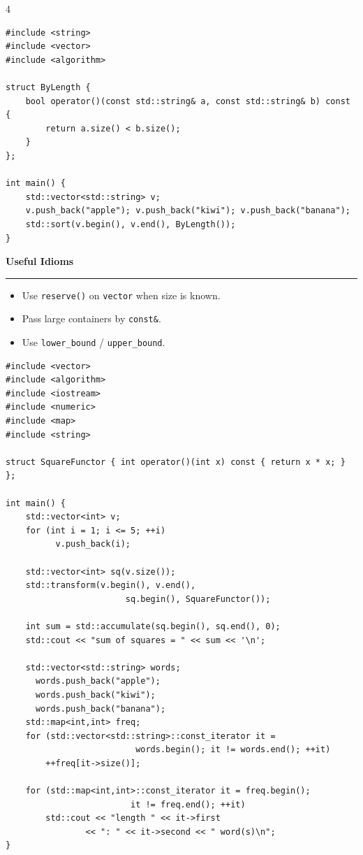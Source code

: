 \documentclass[final]{beamer}
\renewcommand{\section}[1]{%
  \par\vspace{1em}%
  {\noindent\Large\bfseries #1\par}%
  \vspace{0.5em}\hrule\vspace{1em}%
}
\begin{document}
\begin{frame}[t,fragile]
\begin{multicols}{4}
\begin{lstlisting}
#include <string>
#include <vector>
#include <algorithm>

struct ByLength {
    bool operator()(const std::string& a, const std::string& b) const {
        return a.size() < b.size();
    }
};

int main() {
    std::vector<std::string> v;
    v.push_back("apple"); v.push_back("kiwi"); v.push_back("banana");
    std::sort(v.begin(), v.end(), ByLength());
}
\end{lstlisting}

\section{Useful Idioms}

\begin{itemize}
  \item Use \texttt{reserve()} on \texttt{vector} when size is known.
  \item Pass large containers by \texttt{const\&}.
  \item Use \texttt{lower\_bound} / \texttt{upper\_bound}.
\end{itemize}


\begin{lstlisting}
#include <vector>
#include <algorithm>
#include <iostream>
#include <numeric>
#include <map>
#include <string>

struct SquareFunctor { int operator()(int x) const { return x * x; } };

int main() {
    std::vector<int> v;
    for (int i = 1; i <= 5; ++i) 
          v.push_back(i);

    std::vector<int> sq(v.size());
    std::transform(v.begin(), v.end(), 
                        sq.begin(), SquareFunctor());

    int sum = std::accumulate(sq.begin(), sq.end(), 0);
    std::cout << "sum of squares = " << sum << '\n';

    std::vector<std::string> words;
      words.push_back("apple");
      words.push_back("kiwi");
      words.push_back("banana");
    std::map<int,int> freq;
    for (std::vector<std::string>::const_iterator it =
                          words.begin(); it != words.end(); ++it)
        ++freq[it->size()];

    for (std::map<int,int>::const_iterator it = freq.begin();
                         it != freq.end(); ++it)
        std::cout << "length " << it->first 
                << ": " << it->second << " word(s)\n";
} 
\end{lstlisting}



\end{multicols}
\end{frame}
\end{document}
